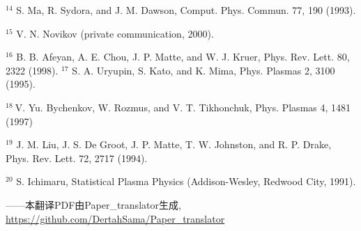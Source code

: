 \documentclass[oneside,onecolumn]{article}
\begin{document}
\begin{sloppypar}
${ }^{14}$ S. Ma, R. Sydora, and J. M. Dawson, Comput. Phys. Commun. 77, 190 (1993).

${ }^{15}$ V. N. Novikov (private communication, 2000).

${ }^{16}$ B. B. Afeyan, A. E. Chou, J. P. Matte, and W. J. Kruer, Phys. Rev. Lett. 80, 2322 (1998). ${ }^{17}$ S. A. Uryupin, S. Kato, and K. Mima, Phys. Plasmas 2, 3100 (1995).

${ }^{18} \mathrm{~V}$. Yu. Bychenkov, W. Rozmus, and V. T. Tikhonchuk, Phys. Plasmas 4, 1481 (1997)

${ }^{19}$ J. M. Liu, J. S. De Groot, J. P. Matte, T. W. Johnston, and R. P. Drake, Phys. Rev. Lett. 72, 2717 (1994).

${ }^{20}$ S. Ichimaru, Statistical Plasma Physics (Addison-Wesley, Redwood City, 1991).

  
  \end{sloppypar}	
  \begin{flushright}
  	\vfill \footnotesize
  	——本翻译PDF由Paper_translator生成, \url{https://github.com/DertahSama/Paper_translator}
  \end{flushright}
  
\end{document}
